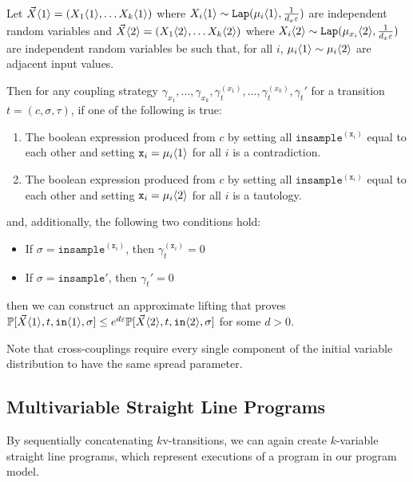 \begin{lemma}\label{mvCrossCoupling}
    Let $\vec{X}\langle1 \rangle = (X_1\langle1 \rangle, \ldots X_k\langle1 \rangle)$ where $X_i\langle1 \rangle\sim \texttt{Lap}(\mu_i\langle1 \rangle, \frac{1}{d_x\varepsilon})$ are independent random variables and $\vec{X}\langle2 \rangle = (X_1\langle2 \rangle, \ldots X_k\langle2 \rangle)$ where $X_i\langle2 \rangle\sim \texttt{Lap}(\mu_{x_i}\langle2 \rangle, \frac{1}{d_x\varepsilon})$ 
    are independent random variables be such that, for all $i$, $\mu_i\langle1 \rangle\sim \mu_i\langle2 \rangle$ are adjacent input values.

    Then for any coupling strategy $\gamma_{x_1}, \ldots, \gamma_{x_k}, \gamma_t^{(x_1)}, \ldots, \gamma_t^{(x_k)}, \gamma_t'$ for a transition $t = (c, \sigma,\tau)$, if one of the following is true: \begin{enumerate}
        \item The boolean expression produced from $c$ by setting all $\texttt{insample}^{(\texttt{x}_i)}$ equal to each other and setting $\texttt{x}_i = \mu_i\langle1 \rangle$ for all $i$ is a contradiction.
        \item The boolean expression produced from $c$ by setting all $\texttt{insample}^{(\texttt{x}_i)}$ equal to each other and setting $\texttt{x}_i = \mu_i\langle2 \rangle$ for all $i$ is a tautology.
    \end{enumerate}
    and, additionally, the following two conditions hold: \begin{itemize}
        \item If $\sigma = \texttt{insample}^{(\texttt{x}_i)}$, then $\gamma_t^{(\texttt{x}_i)}=0$
            \item If $\sigma = \texttt{insample}'$, then $\gamma_t'=0$
    \end{itemize}
    then we can construct an approximate lifting that proves $\mathbb{P}[\vec{X}\langle1 \rangle, t, \texttt{in}\langle1 \rangle, \sigma]\leq e^{d\varepsilon}\mathbb{P}[\vec{X}\langle2 \rangle, t, \texttt{in}\langle2 \rangle, \sigma]$ for some $d>0$. 
\end{lemma}

Note that cross-couplings require every single component of the initial variable distribution to have the same spread parameter.

\subsection{Multivariable Straight Line Programs}

By sequentially concatenating $k$v-transitions, we can again create $k$-variable straight line programs, which represent executions of a program in our program model. 

